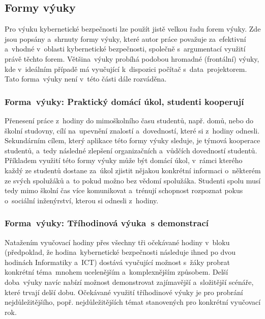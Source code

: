 \documentclass[a4paper, 12pt]{article}
\begin{document}
\subsection{Formy výuky}
Pro výuku kybernetické bezpečnosti lze použít jistě velkou řadu forem výuky. Zde jsou popsány a~shrnuty formy výuky, které autor práce považuje za~efektivní a~vhodné v~oblasti kybernetické bezpečnosti, společně s~argumentací využití právě těchto forem. Většina~výuky probíhá podobou hromadné (frontální) výuky, kde v~ideálním případě má vyučující k~dispozici počítač s~data~projektorem. Tato forma~výuky není v~této části dále rozváděna.

\subsubsection{Forma~výuky: Praktický domácí úkol, studenti kooperují}
Přenesení práce z~hodiny do mimoškolního času studentů, např. domů, nebo do školní studovny, cílí na~upevnění znalostí a~dovedností, které si z~hodiny odnesli. Sekundárním cílem, který aplikace této formy výuky sleduje, je týmová kooperace studentů, a~tedy následné zlepšení organizačních a~vůdčích dovedností studentů. Příkladem využití této formy výuky může být domácí úkol, v~rámci kterého každý ze studentů dostane za~úkol zjistit nějakou konkrétní informaci o~některém ze svých spolužáků a~to pokud možno bez vědomí spolužáka. Studenti spolu musí tedy mimo školní čas více komunikovat a~trénují schopnost rozpoznat pokus o~sociální inženýrství, kterou si odnesli z~hodiny.

\subsubsection{Forma~výuky: Tříhodinová výuka~s demonstrací}
Natažením vyučovací hodiny přes všechny tři očekávané hodiny v~bloku (předpoklad, že hodina~kybernetické bezpečnosti následuje ihned po dvou hodinách Informatiky a~ICT) dostává vyučující možnost s~žáky probrat konkrétní téma~mnohem ucelenějším a~komplexnějším způsobem. Delší doba~výuky navíc nabízí možnost demonstrovat zajímavější a~složitější scénáře, které trvají delší dobu. Očekávané využití tříhodinové výuky je pro probrání nejdůležitějšího, popř. nejdůležitějších témat stanovených pro konkrétní vyučovací rok. 
\end{document}
